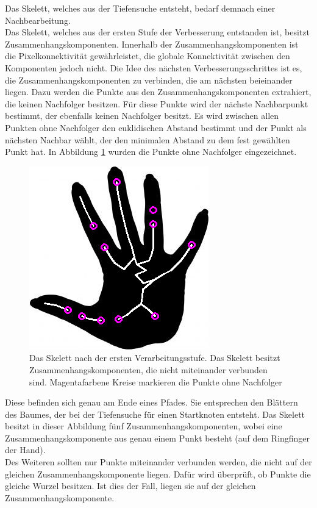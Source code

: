 Das Skelett, welches aus der Tiefensuche entsteht, bedarf demnach einer Nachbearbeitung. \\
Das Skelett, welches aus der ersten Stufe der Verbesserung entstanden ist, besitzt Zusammenhangskomponenten. Innerhalb der Zusammenhangskomponenten ist die Pixelkonnektivität gewährleistet, die globale Konnektivität zwischen den Komponenten jedoch nicht. Die Idee des
nächsten Verbesserungsschrittes ist es, die Zusammenhangskomponenten
zu verbinden, die am nächsten beieinander liegen. Dazu werden
die Punkte aus den Zusammenhangskomponenten extrahiert, die
keinen Nachfolger besitzen. 
Für diese Punkte wird der nächste Nachbarpunkt bestimmt, der
ebenfalls keinen Nachfolger besitzt. Es wird zwischen allen Punkten ohne Nachfolger den euklidischen Abstand bestimmt und der Punkt als nächsten Nachbar wählt, der den minimalen Abstand zu dem fest gewählten Punkt hat. In Abbildung \ref{fig:hand-punkte-ohne-nachfolger} wurden die Punkte ohne Nachfolger eingezeichnet. 
\begin{figure}[htbp]
\centering
\includegraphics[width=0.4\linewidth]{./fig/hand-DFS-ohne-nachfolger}
\caption{Das Skelett nach der ersten Verarbeitungsstufe. Das Skelett besitzt Zusammenhangskomponenten, die nicht 
miteinander verbunden sind. Magentafarbene Kreise markieren die Punkte ohne Nachfolger}
\label{fig:hand-punkte-ohne-nachfolger}
\end{figure}
Diese befinden sich genau am Ende eines Pfades. Sie entsprechen den Blättern des Baumes, der bei der Tiefensuche für einen Startknoten entsteht. Das Skelett besitzt in dieser Abbildung fünf Zusammenhangskomponenten,
wobei eine Zusammenhangskomponente aus genau einem Punkt besteht
(auf dem Ringfinger der Hand).\\
Des Weiteren sollten nur Punkte miteinander verbunden werden, die
nicht auf der gleichen Zusammenhangskomponente liegen. Dafür wird
überprüft, ob Punkte die gleiche Wurzel besitzen. Ist dies der 
Fall, liegen sie auf der gleichen Zusammenhangskomponente. \\
